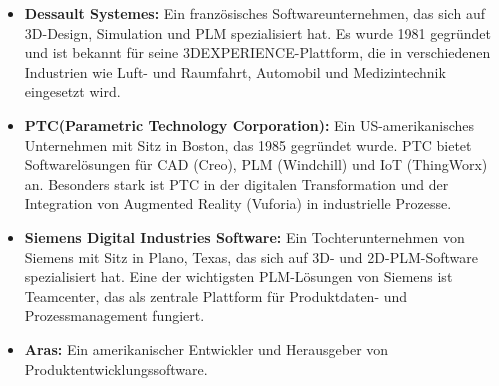 \begin{itemize}
	\item \textbf{Dessault Systemes:} Ein französisches Softwareunternehmen, das sich auf 3D-Design, Simulation und  PLM spezialisiert hat. Es wurde 1981 gegründet und ist bekannt für seine 3DEXPERIENCE-Plattform, die in verschiedenen Industrien wie Luft- und Raumfahrt, Automobil und Medizintechnik eingesetzt wird\cite{Dessault}.
	\item \textbf{PTC(Parametric Technology Corporation):} Ein US-amerikanisches Unternehmen mit Sitz in Boston, das 1985 gegründet wurde. PTC bietet Softwarelösungen für CAD (Creo), PLM (Windchill) und IoT (ThingWorx) an. Besonders stark ist PTC in der digitalen Transformation und der Integration von Augmented Reality (Vuforia) in industrielle Prozesse\cite{PTC}.
	\item \textbf{Siemens Digital Industries Software:} Ein Tochterunternehmen von Siemens mit Sitz in Plano, Texas, das sich auf 3D- und 2D-PLM-Software spezialisiert hat.  Eine der wichtigsten PLM-Lösungen von Siemens ist Teamcenter, das als zentrale Plattform für Produktdaten- und Prozessmanagement fungiert\cite{Siemens}.
	\item \textbf{Aras:} Ein amerikanischer Entwickler und Herausgeber von Produktentwicklungssoftware\cite{Aras}.
\end{itemize}
 